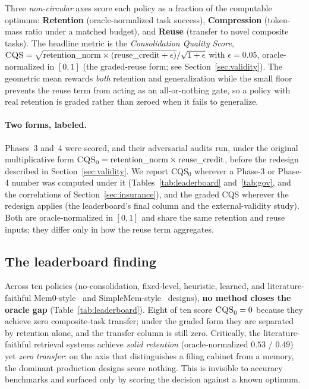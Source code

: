 \documentclass[11pt]{article}
\newcommand{\cqs}{\textsc{CQS}}
\newcommand{\cqsz}{\textsc{CQS}\ensuremath{_0}}
\begin{document}
Three \emph{non-circular} axes score each policy as a fraction of the computable
optimum: \textbf{Retention} (oracle-normalized task success), \textbf{Compression}
(token-mass ratio under a matched budget), and \textbf{Reuse} (transfer to novel
composite tasks). The headline metric is the \emph{Consolidation Quality Score},
$\cqs{} = \sqrt{\text{retention\_norm}\times(\text{reuse\_credit}+\epsilon)}/\sqrt{1+\epsilon}$
with $\epsilon=0.05$, oracle-normalized in $[0,1]$ (the graded-reuse form; see
Section~\ref{sec:validity}). The geometric mean rewards \emph{both} retention and
generalization while the small floor prevents the reuse term from acting as an
all-or-nothing gate, so a policy with real retention is graded rather than zeroed when
it fails to generalize.

\paragraph{Two forms, labeled.} Phases~3 and~4 were scored, and their adversarial audits
run, under the original multiplicative form
$\cqsz{} = \text{retention\_norm}\times\text{reuse\_credit}$, before the redesign
described in Section~\ref{sec:validity}. We report \cqsz{} wherever a Phase-3 or Phase-4
number was computed under it (Tables~\ref{tab:leaderboard} and~\ref{tab:gov}, and the
correlations of Section~\ref{sec:insurance}), and the graded \cqs{} wherever the redesign
applies (the leaderboard's final column and the external-validity study). Both are
oracle-normalized in $[0,1]$ and share the same retention and reuse inputs; they differ
only in how the reuse term aggregates.

\subsection{The leaderboard finding}
Across ten policies (no-consolidation, fixed-level, heuristic, learned, and
literature-faithful Mem0-style~\cite{mem0,zep} and SimpleMem-style~\cite{simplemem}
designs), \textbf{no method closes the oracle gap} (Table~\ref{tab:leaderboard}).
Eight of ten score $\cqsz{}=0$ because they achieve zero composite-task transfer; under
the graded form they are separated by retention alone, and the transfer column is still
zero. Critically, the literature-faithful retrieval systems achieve \emph{solid
retention} (oracle-normalized $0.53$ / $0.49$) yet \emph{zero transfer}: on the axis that
distinguishes a filing cabinet from a memory, the dominant production designs score
nothing. This is invisible to accuracy benchmarks and surfaced only by scoring the
decision against a known optimum.
\end{document}
